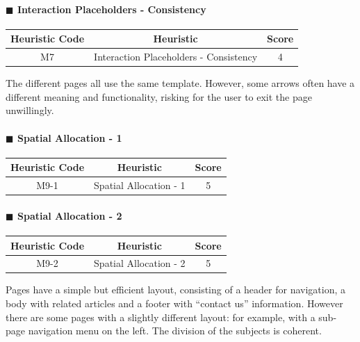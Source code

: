 \documentclass[11pt]{article} %
\begin{document}
\paragraph{$\blacksquare$ Interaction Placeholders - Consistency}
\begin{center}
    \begin{tabular}{|c|c|c|} 
    \hline
    \textbf{Heuristic Code} & \textbf{Heuristic} & \textbf{Score}\\ 
    \hline
    M7 & Interaction Placeholders - Consistency & 4 \\
    \hline
    \end{tabular}
\end{center}
The different pages all use the same template. However, some arrows often have a different meaning and functionality, risking for the user to exit the page unwillingly.

\paragraph{$\blacksquare$ Spatial Allocation - 1}
\begin{center}
    \begin{tabular}{|c|c|c|} 
    \hline
    \textbf{Heuristic Code} & \textbf{Heuristic} & \textbf{Score}\\ 
    \hline
    M9-1 & Spatial Allocation - 1 & 5 \\
    \hline
    \end{tabular}
\end{center}

\paragraph{$\blacksquare$ Spatial Allocation - 2}
\begin{center}
    \begin{tabular}{|c|c|c|} 
    \hline
    \textbf{Heuristic Code} & \textbf{Heuristic} & \textbf{Score}\\ 
    \hline
    M9-2 & Spatial Allocation - 2 & 5 \\
    \hline
    \end{tabular}
\end{center}
Pages have a simple but efficient layout, consisting of a header for navigation, a body with related articles and a footer with “contact us” information. However there are some pages with a slightly different layout: for example, with a sub-page navigation menu on the left.
The division of the subjects is coherent.
\end{document}
